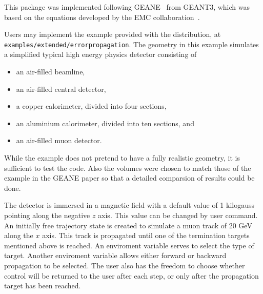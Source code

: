 This package was implemented following GEANE~\cite{errprop:geane} from GEANT3,
which was based on the equations developed by the EMC 
collaboration~\cite{errprop:emc}. 

Users may implement the example provided with the \Gfour{} distribution, at 
\verb"examples/extended/errorpropagation".  The geometry in this example 
simulates a simplified typical high energy physics detector consisting of
\begin{itemize}
\item  an air-filled beamline,
\item  an air-filled central detector, 
\item  a copper calorimeter, divided into four sections,
\item  an aluminium calorimeter, divided into ten sections, and
\item  an air-filled muon detector.
\end{itemize}
While the example does not pretend to have a fully realistic geometry, it is 
sufficient to test the code.  Also the volumes were chosen to match those of
the example in the GEANE paper so that a detailed comparsion of results could
be done.
  
The detector is immersed in a magnetic field with a default value of 1 kilogauss
pointing along the negative $z$ axis.  This value can be changed by user command.
An initially free trajectory state is created to simulate a muon track of 20 GeV
along the $x$ axis.  This track is propagated until one of the termination 
targets mentioned above is reached.  An enviroment variable serves to select the
type of target.  Another enviroment variable allows either forward or backward 
propagation to be selected.  The user also has the freedom to choose whether
control will be returned to the user after each step, or only after the 
propagation target has been reached.


